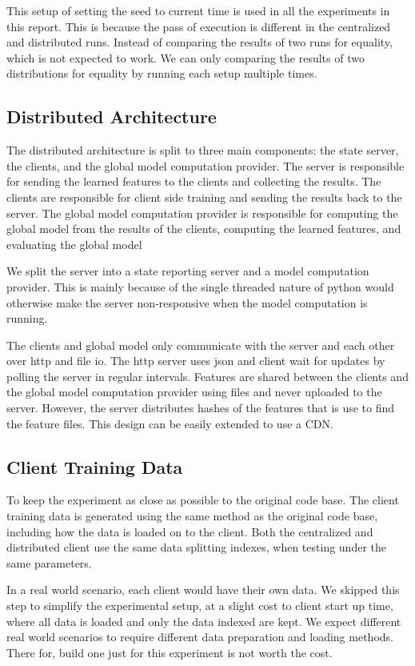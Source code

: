 \documentclass{article}
\begin{document}
This setup of setting the seed to current time is used in all the experiments in this report. This is because the pass of execution is different in the centralized and distributed runs. Instead of comparing the results of two runs for equality, which is not expected to work. We can only comparing the results of two distributions for equality by running each setup multiple times.

\subsection{Distributed Architecture}
The distributed architecture is split to three main components: the state server, the clients, and the global model computation provider. The server is responsible for sending the learned features to the clients and collecting the results. The clients are responsible for client side training and sending the results back to the server. The global model computation provider is responsible for computing the global model from the results of the clients, computing the learned features, and evaluating the global model

We split the server into a state reporting server and a model computation provider. This is mainly because of the single threaded nature of python would otherwise make the server non-responsive when the model computation is running. 

The clients and global model only communicate with the server and each other over http and file io. The http server uses json and client wait for updates by polling the server in regular intervals. Features are shared between the clients and the global model computation provider using files and never uploaded to the server. However, the server distributes hashes of the features that is use to find the feature files. This design can be easily extended to use a CDN.

\subsection{Client Training Data}
To keep the experiment as close as possible to the original code base. The client training data is generated using the same method as the original code base, including how the data is loaded on to the client. Both the centralized and distributed client use the same data splitting indexes, when testing under the same parameters.

In a real world scenario, each client would have their own data. We skipped this step to simplify the experimental setup, at a slight cost to client start up time, where all data is loaded and only the data indexed are kept. We expect different real world scenarios to require different data preparation and loading methods. There for, build one just for this experiment is not worth the cost.
\end{document}
